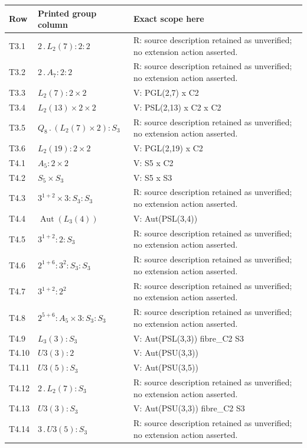 \begin{longtable}{@{}lp{.40\linewidth}p{.46\linewidth}@{}}
\toprule Row & Printed group column & Exact scope here\\\midrule\endhead
T3.1 & $2 \mathbin{.} L_{2}(7) : 2 : 2$ & R: source description retained as unverified; no extension action asserted.\\
T3.2 & $2 \mathbin{.} A_{7} : 2 : 2$ & R: source description retained as unverified; no extension action asserted.\\
T3.3 & $L_{2}(7) : 2 \times 2$ & V: PGL(2,7) x C2\\
T3.4 & $L_{2}(13) \times 2 \times 2$ & V: PSL(2,13) x C2 x C2\\
T3.5 & $Q_{8} \mathbin{.} (L_{2}(7) \times 2) : S_{3}$ & R: source description retained as unverified; no extension action asserted.\\
T3.6 & $L_{2}(19) : 2 \times 2$ & V: PGL(2,19) x C2\\
T4.1 & $A_{5} : 2 \times 2$ & V: S5 x C2\\
T4.2 & $S_{5} \times S_{3}$ & V: S5 x S3\\
T4.3 & $3^{1+2} \times 3 : S_{3} : S_{3}$ & R: source description retained as unverified; no extension action asserted.\\
T4.4 & $\operatorname{Aut}(L_{3}(4))$ & V: Aut(PSL(3,4))\\
T4.5 & $3^{1+2} : 2 : S_{3}$ & R: source description retained as unverified; no extension action asserted.\\
T4.6 & $2^{1+6} : 3^2 : S_{3} : S_{3}$ & R: source description retained as unverified; no extension action asserted.\\
T4.7 & $3^{1+2} : 2^2$ & R: source description retained as unverified; no extension action asserted.\\
T4.8 & $2^{5+6} : A_{5} \times 3 : S_{3} : S_{3}$ & R: source description retained as unverified; no extension action asserted.\\
T4.9 & $L_{3}(3) : S_{3}$ & V: Aut(PSL(3,3)) fibre\_C2 S3\\
T4.10 & $U3(3) : 2$ & V: Aut(PSU(3,3))\\
T4.11 & $U3(5) : S_{3}$ & V: Aut(PSU(3,5))\\
T4.12 & $2 \mathbin{.} L_{2}(7) : S_{3}$ & R: source description retained as unverified; no extension action asserted.\\
T4.13 & $U3(3) : S_{3}$ & V: Aut(PSU(3,3)) fibre\_C2 S3\\
T4.14 & $3 \mathbin{.} U3(5) : S_{3}$ & R: source description retained as unverified; no extension action asserted.\\

\end{longtable}
